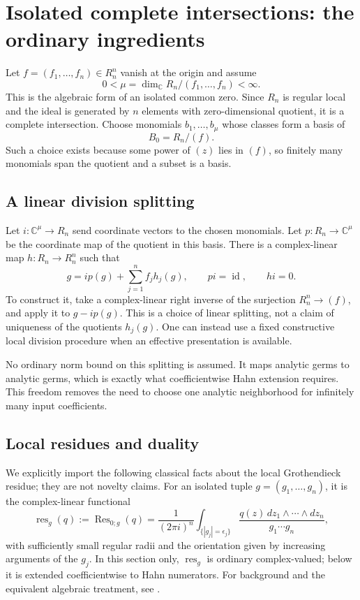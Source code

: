 \documentclass[11pt,letterpaper]{article}
\theoremstyle{definition}
\theoremstyle{remark}
\newcommand{\C}{\mathbb C}
\newcommand{\Res}{\operatorname{Res}}
\newcommand{\res}{\operatorname{res}}
\newcommand{\id}{\operatorname{id}}
\numberwithin{equation}{section}
\begin{document}
\section{Isolated complete intersections: the ordinary ingredients}\label{sec:ordinary-residue}

Let $f=(f_1,\ldots,f_n)\in R_n^n$ vanish at the origin and assume
\begin{equation}\label{eq:mu}
 0<\mu=\dim_\C R_n/(f_1,\ldots,f_n)<\infty.
\end{equation}
This is the algebraic form of an isolated common zero. Since $R_n$ is regular local and the ideal is generated by $n$ elements with zero-dimensional quotient, it is a complete intersection. Choose monomials $b_1,\ldots,b_\mu$ whose classes form a basis of
\[
 B_0=R_n/(f).
\]
Such a choice exists because some power of $(z)$ lies in $(f)$, so finitely many monomials span the quotient and a subset is a basis.

\subsection{A linear division splitting}
Let $i:\C^\mu\to R_n$ send coordinate vectors to the chosen monomials. Let $p:R_n\to\C^\mu$ be the coordinate map of the quotient in this basis. There is a complex-linear map $h:R_n\to R_n^n$ such that
\begin{equation}\label{eq:splitting}
 g=i p(g)+\sum_{j=1}^n f_jh_j(g),\qquad
 pi=\id,\qquad hi=0.
\end{equation}
To construct it, take a complex-linear right inverse of the surjection $R_n^n\to(f)$, and apply it to $g-ip(g)$. This is a choice of linear splitting, not a claim of uniqueness of the quotients $h_j(g)$. One can instead use a fixed constructive local division procedure when an effective presentation is available.

No ordinary norm bound on this splitting is assumed. It maps analytic germs to analytic germs, which is exactly what coefficientwise Hahn extension requires. This freedom removes the need to choose one analytic neighborhood for infinitely many input coefficients.

\subsection{Local residues and duality}
We explicitly import the following classical facts about the local Grothendieck residue; they are not novelty claims. For an isolated tuple $g=(g_1,\ldots,g_n)$, it is the complex-linear functional
\begin{equation}\label{eq:classical-residue}
 \res_g(q):=\Res_{0;g}(q)
 =\frac{1}{(2\pi i)^n}\int_{\{|g_j|=\epsilon_j\}}
 \frac{q(z)\,dz_1\wedge\cdots\wedge dz_n}{g_1\cdots g_n},
\end{equation}
with sufficiently small regular radii and the orientation given by increasing arguments of the $g_j$. In this section only, $\res_g$ is ordinary complex-valued; below it is extended coefficientwise to Hahn numerators. For background and the equivalent algebraic treatment, see \cite{Tsikh,SS,CDS}.
\end{document}

